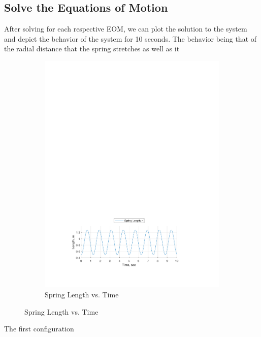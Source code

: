 \documentclass[12pt]{report}
\begin{document}
\begin{flushleft}
\section{Solve the Equations of Motion} \label{section:solve}
After solving for each respective EOM, we can plot the solution to the system and depict
the behavior of the system for 10 seconds. The behavior being that of the radial distance
that the spring stretches as well as it
\begin{figure}[!htp]
  \caption{Numerical Solution Motion Behavior Plot, ($\theta_o:~0,~\phi_o:~0$)}
  \begin{subfigure}[t]{\textwidth}
  \includegraphics[center]{spring_0-0}
  \caption*{Spring Length vs. Time}
  \label{fig:spring:0:0}
\end{subfigure}
\end{figure}

The first configuration


\end{flushleft}
\end{document}
